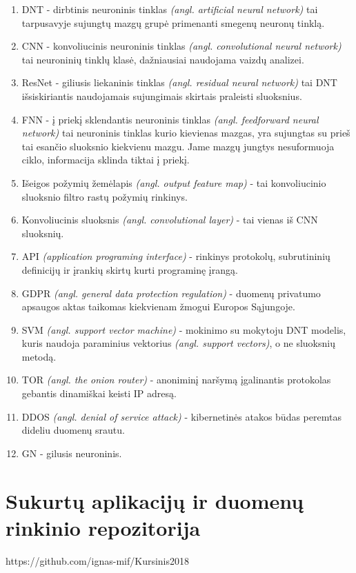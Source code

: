 \documentclass{VUMIFPSkursinis}
\begin{document}
\begin{enumerate}
  \item DNT - dirbtinis neuroninis tinklas \textit{(angl. artificial neural network)} tai tarpusavyje sujungtų mazgų grupė primenanti smegenų neuronų tinklą.
  \item CNN - konvoliucinis neuroninis tinklas \textit{(angl. convolutional neural network)} tai neuroninių tinklų klasė, dažniausiai naudojama vaizdų analizei.
  \item ResNet - giliusis liekaninis tinklas \textit{(angl. residual neural network)} tai DNT išsiskiriantis naudojamais sujungimais skirtais praleisti sluoksnius.
  \item FNN - į priekį sklendantis neuroninis tinklas \textit{(angl. feedforward neural network)} tai neuroninis tinklas kurio kievienas mazgas, yra sujungtas su prieš tai esančio sluoksnio kiekvienu mazgu. Jame mazgų jungtys nesuformuoja ciklo, informacija sklinda tiktai į priekį.
  \item Išeigos požymių žemėlapis \textit{(angl. output feature map)} - tai konvoliucinio sluoksnio filtro rastų požymių rinkinys.
  \item Konvoliucinis sluoksnis \textit{(angl. convolutional layer)} - tai vienas iš CNN sluoksnių.
  \item API \textit{(application programing interface)} - rinkinys protokolų, subrutininių definicijų ir įrankių skirtų kurti programinę įrangą.
  \item GDPR \textit{(angl. general data protection regulation)} - duomenų privatumo apsaugos aktas taikomas kiekvienam žmogui Europos Sąjungoje.
  \item SVM \textit{(angl. support vector machine)} - mokinimo su mokytoju DNT modelis, kuris naudoja paraminius vektorius \textit{(angl. support vectors)}, o ne sluoksnių metodą.
  \item TOR \textit{(angl. the onion router)} - anoniminį naršymą įgalinantis protokolas gebantis dinamiškai keisti IP adresą.
  \item DDOS \textit{(angl. denial of service attack)} - kibernetinės atakos būdas peremtas dideliu duomenų srautu.
  \item GN - gilusis neuroninis.
\end{enumerate}

\appendix  %
\section{Sukurtų aplikacijų ir duomenų rinkinio repozitorija}

https://github.com/ignas-mif/Kursinis2018
\end{document}
